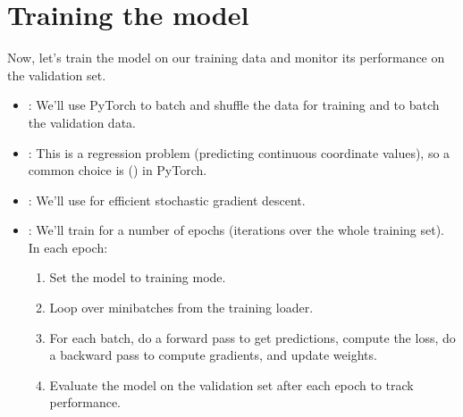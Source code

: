 \documentclass[letterpaper,10pt,english]{jupyterBook}
\begin{document}
\section{Training the model}
\label{\detokenize{04:training-the-model}}
\sphinxAtStartPar
Now, let’s train the model on our training data and monitor its performance on the validation set.
\begin{itemize}
\item {} 
\sphinxAtStartPar
{}: We’ll use PyTorch  to batch and shuffle the data for training and to batch the validation data.

\item {} 
\sphinxAtStartPar
{}: This is a regression problem (predicting continuous coordinate values), so a common choice is  () in PyTorch.

\item {} 
\sphinxAtStartPar
{}: We’ll use  for efficient stochastic gradient descent.

\item {} 
\sphinxAtStartPar
{}: We’ll train for a number of epochs (iterations over the whole training set). In each epoch:
\begin{enumerate}
%
\item {} 
\sphinxAtStartPar
Set the model to training mode.

\item {} 
\sphinxAtStartPar
Loop over mini\sphinxhyphen{}batches from the training loader.

\item {} 
\sphinxAtStartPar
For each batch, do a forward pass to get predictions, compute the loss, do a backward pass to compute gradients, and update weights.

\item {} 
\sphinxAtStartPar
Evaluate the model on the validation set after each epoch to track performance.

\end{enumerate}

\end{itemize}
\end{document}

